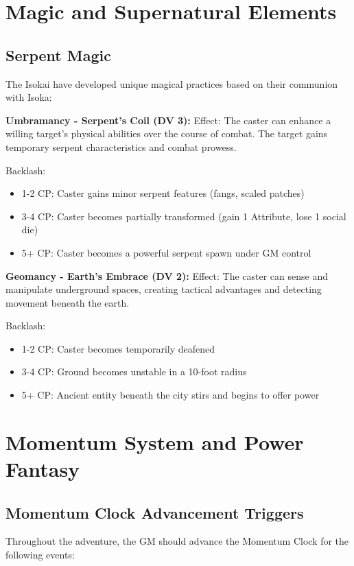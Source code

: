 \documentclass[12pt,twoside]{article}
\begin{document}
\section{Magic and Supernatural Elements}

\subsection{Serpent Magic}

The Isokai have developed unique magical practices based on their communion with Isoka:

\textbf{Umbramancy - Serpent's Coil (DV 3):}
Effect: The caster can enhance a willing target's physical abilities over the course of combat. The target gains temporary serpent characteristics and combat prowess.

Backlash:
\begin{itemize}
  \item 1-2 CP: Caster gains minor serpent features (fangs, scaled patches)
  \item 3-4 CP: Caster becomes partially transformed (gain 1 Attribute, lose 1 social die)
  \item 5+ CP: Caster becomes a powerful serpent spawn under GM control
\end{itemize}

\textbf{Geomancy - Earth's Embrace (DV 2):}
Effect: The caster can sense and manipulate underground spaces, creating tactical advantages and detecting movement beneath the earth.

Backlash:
\begin{itemize}
  \item 1-2 CP: Caster becomes temporarily deafened
  \item 3-4 CP: Ground becomes unstable in a 10-foot radius
  \item 5+ CP: Ancient entity beneath the city stirs and begins to offer power
\end{itemize}

\section{Momentum System and Power Fantasy}

\subsection{Momentum Clock Advancement Triggers}

Throughout the adventure, the GM should advance the Momentum Clock for the following events:
\end{document}
